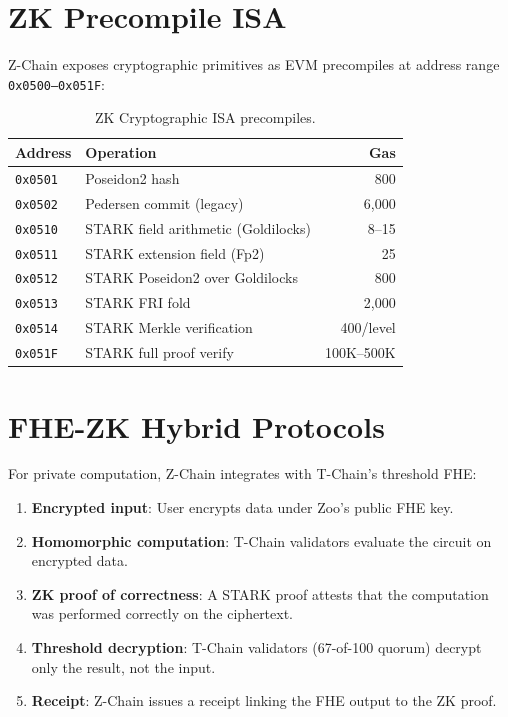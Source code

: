 \documentclass[11pt,a4paper]{article}
\begin{document}
\section{ZK Precompile ISA}

Z-Chain exposes cryptographic primitives as EVM precompiles at address range \texttt{0x0500--0x051F}:

\begin{table}[h]
\centering
\begin{tabular}{llr}
\toprule
\textbf{Address} & \textbf{Operation} & \textbf{Gas} \\
\midrule
\texttt{0x0501} & Poseidon2 hash & 800 \\
\texttt{0x0502} & Pedersen commit (legacy) & 6,000 \\
\texttt{0x0510} & STARK field arithmetic (Goldilocks) & 8--15 \\
\texttt{0x0511} & STARK extension field (Fp2) & 25 \\
\texttt{0x0512} & STARK Poseidon2 over Goldilocks & 800 \\
\texttt{0x0513} & STARK FRI fold & 2,000 \\
\texttt{0x0514} & STARK Merkle verification & 400/level \\
\texttt{0x051F} & STARK full proof verify & 100K--500K \\
\bottomrule
\end{tabular}
\caption{ZK Cryptographic ISA precompiles.}
\end{table}

\section{FHE-ZK Hybrid Protocols}

For private computation, Z-Chain integrates with T-Chain's threshold FHE:

\begin{enumerate}
\item \textbf{Encrypted input}: User encrypts data under Zoo's public FHE key.
\item \textbf{Homomorphic computation}: T-Chain validators evaluate the circuit on encrypted data.
\item \textbf{ZK proof of correctness}: A STARK proof attests that the computation was performed correctly on the ciphertext.
\item \textbf{Threshold decryption}: T-Chain validators (67-of-100 quorum) decrypt only the result, not the input.
\item \textbf{Receipt}: Z-Chain issues a receipt linking the FHE output to the ZK proof.
\end{enumerate}
\end{document}
